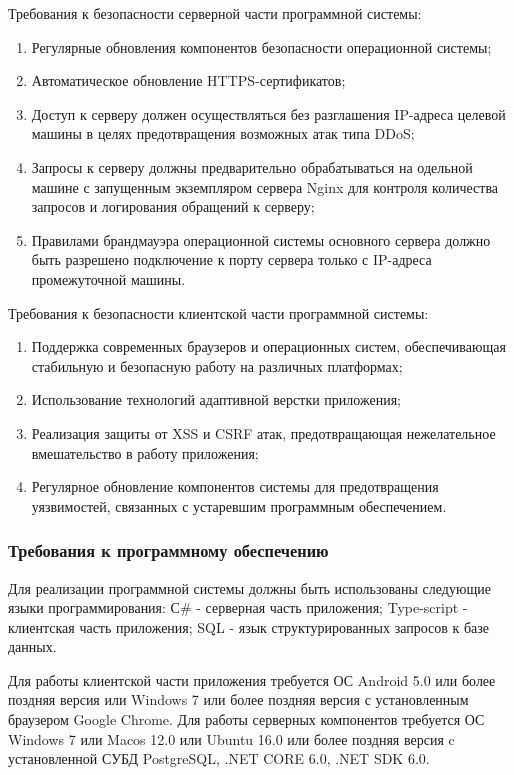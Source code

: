 Требования к безопасности серверной части программной системы:
\begin{enumerate}
\item Регулярные обновления компонентов безопасности операционной системы;
\item Автоматическое обновление HTTPS-сертификатов;
\item Доступ к серверу должен осуществляться без разглашения IP-адреса целевой машины в целях предотвращения возможных атак типа DDoS;
\item Запросы к серверу должны предварительно обрабатываться на одельной машине с запущенным экземпляром сервера Nginx для контроля количества запросов и логирования обращений к серверу;
\item Правилами брандмауэра операционной системы основного сервера должно быть разрешено подключение к порту сервера только с IP-адреса промежуточной машины.
\end{enumerate}

Требования к безопасности клиентской части программной системы:
\begin{enumerate}
\item Поддержка современных браузеров и операционных систем, обеспечивающая стабильную и безопасную работу на различных платформах;
\item Использование технологий адаптивной верстки приложения;
\item Реализация защиты от XSS и CSRF атак, предотвращающая нежелательное вмешательство в работу приложения;
\item Регулярное обновление компонентов системы для предотвращения уязвимостей, связанных с устаревшим программным обеспечением.
\end{enumerate}

\subsubsection{Требования к программному обеспечению}
Для реализации программной системы должны быть использованы следующие языки программирования:
С\# -\- серверная часть приложения;
Type-script -\- клиентская часть приложения;
SQL -\- язык структурированных запросов к базе данных.

Для работы клиентской части приложения требуется ОС Android 5.0 или более поздняя версия или Windows 7 или более поздняя версия с установленным браузером Google Chrome.
Для работы серверных компонентов требуется ОС Windows 7 или Macos 12.0 или Ubuntu 16.0 или более поздняя версия c установленной СУБД PostgreSQL, .NET CORE 6.0, .NET SDK 6.0.

